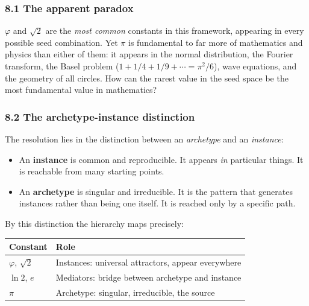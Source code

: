 \documentclass[
  11pt,
  letterpaper,
]{article}
\providecommand{\tightlist}{%
  \setlength{\itemsep}{0pt}\setlength{\parskip}{0pt}}
\begin{document}
\subsubsection{8.1 The apparent paradox}\label{the-apparent-paradox}

\(\varphi\) and \(\sqrt{2}\) are the \emph{most common} constants in
this framework, appearing in every possible seed combination. Yet
\(\pi\) is fundamental to far more of mathematics and physics than
either of them: it appears in the normal distribution, the Fourier
transform, the Basel problem (\(1 + 1/4 + 1/9 + \cdots = \pi^2/6\)),
wave equations, and the geometry of all circles. How can the rarest
value in the seed space be the most fundamental value in mathematics?

\subsubsection{8.2 The archetype-instance
distinction}\label{the-archetype-instance-distinction}

The resolution lies in the distinction between an \emph{archetype} and
an \emph{instance}:

\begin{itemize}
\tightlist
\item
  An \textbf{instance} is common and reproducible. It appears \emph{in}
  particular things. It is reachable from many starting points.
\item
  An \textbf{archetype} is singular and irreducible. It is the pattern
  that generates instances rather than being one itself. It is reached
  only by a specific path.
\end{itemize}

By this distinction the hierarchy maps precisely:

\begin{longtable}[]{@{}
  >{\raggedright\arraybackslash}p{}
  >{\raggedright\arraybackslash}p{}@{}}
\toprule\noalign{}
\begin{minipage}[b]{\linewidth}\raggedright
Constant
\end{minipage} & \begin{minipage}[b]{\linewidth}\raggedright
Role
\end{minipage} \\
\midrule\noalign{}
\endhead
\bottomrule\noalign{}
\endlastfoot
\(\varphi\), \(\sqrt{2}\) & Instances: universal attractors, appear
everywhere \\
\(\ln 2\), \(e\) & Mediators: bridge between archetype and instance \\
\(\pi\) & Archetype: singular, irreducible, the source \\
\end{longtable}
\end{document}
